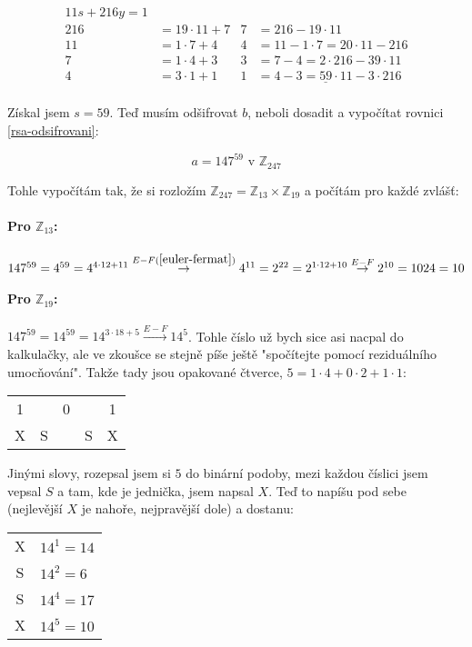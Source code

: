 \documentclass{article}
\begin{document}
\begin{align*}
11s + 216y = 1 & 								& 		&  \\
216 & = 19\cdot 11 + 7 					& 7	  &= 216-19\cdot 11 \\
11 & = 1\cdot 7 + 4 						& 4 	&= 11 - 1\cdot 7 = 20\cdot 11 - 216 \\
7  & = 1\cdot 4 + 3							& 3 	&= 7 - 4 = 2\cdot 216 - 39 \cdot 11 \\
4  & = 3\cdot 1 + 1							& 1 	&= 4 - 3 = \underline{59}\cdot 11 - 3 \cdot 216 \\
\end{align*}

Získal jsem $s = 59$. Teď musím odšifrovat $b$, neboli dosadit a vypočítat rovnici \ref{rsa-odsifrovani}:

$$a = 147^{59}\mbox{ v } \mathbb{Z}_{247}$$

Tohle vypočítám tak, že si rozložím $\mathbb{Z}_{247} = \mathbb{Z}_{13} \times \mathbb{Z}_{19}$ a počítám pro každé zvlášť:

\paragraph{Pro $\mathbb{Z}_{13}$: }
$147^{59} = 4^{59} = 4^{4\cdot12 + 11} \stackrel{E-F (\ref{euler-fermat})}{\rightarrow} 4^{11} = 2^{22} = 2^{1\cdot12+10}  \stackrel{E-F}{\rightarrow} 2^{10} = 1024 = 10$

\paragraph{Pro $\mathbb{Z}_{19}$: }
$147^{59} = 14^{59} = 14^{3\cdot18 + 5} \stackrel{E-F}{\rightarrow} 14^{5}$. Tohle číslo už bych sice asi nacpal do kalkulačky, ale ve zkoušce se stejně píše ještě "spočítejte pomocí reziduálního umocňování". Takže tady jsou opakované čtverce, $5 = 1\cdot4 + 0\cdot2 + 1\cdot1$:
\begin{center}  %
  \begin{tabular}{c|c|c|c|c}
		1 &   & 0 &   & 1 \\ 
		X & S &   & S & X \\
	\end{tabular}
\end{center}

Jinými slovy, rozepsal jsem si $5$ do binární podoby, mezi každou číslici jsem vepsal $S$ a tam, kde je jednička, jsem napsal $X$. Teď to napíšu pod sebe (nejlevější $X$ je nahoře, nejpravější dole) a dostanu: 
\begin{center}
	\begin{tabular}{c|l}
		X & $14^1 = 14$ \\
		S & $14^2 = 6$ \\
		S & $14^4 = 17$ \\
		X & $14^5 = 10$
	\end{tabular}
\end{center}
\end{document}
